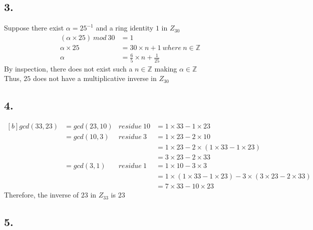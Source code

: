 \documentclass[11pt]{article}
\begin{document}
\pagebreak

\subsection*{3.}
Suppose there exist $\alpha=25^{-1}$ and a ring identity $1$ in $Z_{30}$
\begin{equation}
\begin{split}
(\alpha\times25)\ mod\ 30&= 1\\
\alpha\times25&=30\times n+1\ where\ n\in\mathbb{Z}\\
\alpha&=\frac{6}{5}\times n + \frac{1}{25} 
\end{split}
\end{equation}
By inspection, there does not exist such a $n\in\mathbb{Z}$ making $\alpha\in\mathbb{Z}$\\
Thus, $25$ does not have a multiplicative inverse in $Z_{30}$

\subsection*{4.}
\begin{equation}
\begin{aligned}[b]
gcd(33,23)	&=gcd(23,10)	&residue\ 10&= 1\times 33-1\times 23\\
		  	&=gcd(10,3)		&residue\  3&= 1\times 23-2\times 10\\
		  	&				&			&= 1\times 23-2\times (1\times 33-1\times 23)\\
		  	&				&			&= 3\times 23-2\times 33\\
		  	&=gcd(3,1)		&residue\  1&= 1\times 10-3\times 3\\
		  	&				&			&= 1\times(1\times 33-1\times 23)-3\times(3\times 23-2\times 33)\\
		  	&				&			&= 7\times 33-10\times 23
\end{aligned}
\end{equation}
Therefore, the inverse of $23$ in $Z_{33}$ is $23$
\subsection*{5.}
\end{document}
